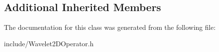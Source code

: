 \subsection*{Additional Inherited Members}


The documentation for this class was generated from the following file\+:\begin{DoxyCompactItemize}
\item 
include/Wavelet2\+D\+Operator.\+h\end{DoxyCompactItemize}
